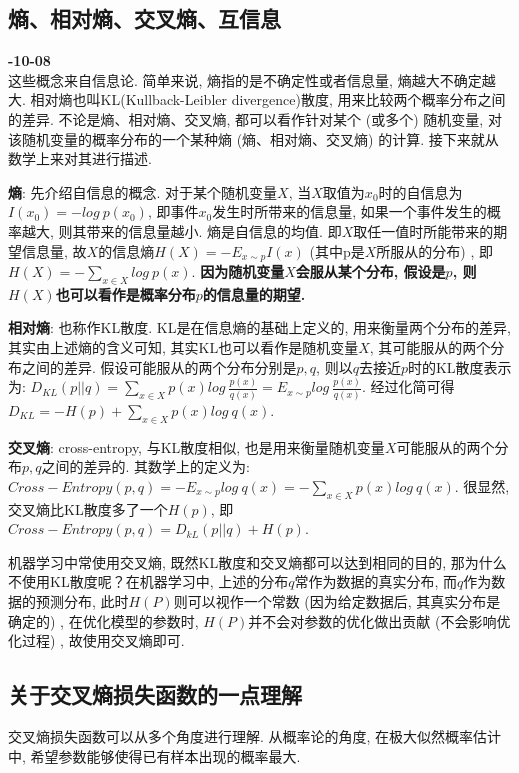\subsection{熵、相对熵、交叉熵、互信息} 
\textbf{-10-08}\\
这些概念来自信息论\cite{6773024}. 简单来说, 熵指的是不确定性或者信息量, 熵越大不确定越大. 相对熵也叫KL(Kullback-Leibler divergence)散度, 用来比较两个概率分布之间的差异. 不论是熵、相对熵、交叉熵, 都可以看作针对某个 (或多个) 随机变量, 对该随机变量的概率分布的一个某种熵 (熵、相对熵、交叉熵) 的计算. 接下来就从数学上来对其进行描述. 

\textbf{熵}: 先介绍自信息的概念. 对于某个随机变量$X$, 当$X$取值为$x_0$时的自信息为$I(x_0) = -log\ p(x_0)$, 即事件$x_0$发生时所带来的信息量, 如果一个事件发生的概率越大, 则其带来的信息量越小. 熵是自信息的均值. 即$X$取任一值时所能带来的期望信息量, 故$X$的信息熵$H(X) = -E_{x\sim p}I(x)$ (其中p是$X$所服从的分布) , 即$H(X) = -\sum_{x \in X}log\ p(x)$. \textbf{因为随机变量$X$会服从某个分布, 假设是$p$, 则$H(X)$也可以看作是概率分布$p$的信息量的期望. }

\textbf{相对熵}: 也称作KL散度. KL是在信息熵的基础上定义的, 用来衡量两个分布的差异, 其实由上述熵的含义可知, 其实KL也可以看作是随机变量$X$, 其可能服从的两个分布之间的差异. 假设可能服从的两个分布分别是$p, q$, 则以$q$去接近$p$时的KL散度表示为: $D_{KL}(p||q) = \sum_{x \in X} p(x) log\ \frac{p(x)}{q(x)} = E_{x\sim p} log\ \frac{p(x)}{q(x)}$. 经过化简可得$D_{KL} = -H(p) + \sum_{x \in X}p(x)log\ q(x)$. 

\textbf{交叉熵}: \label{ce}cross-entropy, 与KL散度相似, 也是用来衡量随机变量$X$可能服从的两个分布$p, q$之间的差异的. 其数学上的定义为: $Cross-Entropy(p, q) = -E_{x\sim p} log\ q(x) = - \sum_{x \in X}p(x)log\ q(x)$. 很显然, 交叉熵比KL散度多了一个$H(p)$, 即$Cross-Entropy(p, q) = D_{kL}(p || q) + H(p)$. 

机器学习中常使用交叉熵, 既然KL散度和交叉熵都可以达到相同的目的, 那为什么不使用KL散度呢？在机器学习中, 上述的分布$q$常作为数据的真实分布, 而$q$作为数据的预测分布, 此时$H(P)$则可以视作一个常数 (因为给定数据后, 其真实分布是确定的) , 在优化模型的参数时, $H(P)$并不会对参数的优化做出贡献 (不会影响优化过程) , 故使用交叉熵即可. 

\subsection{关于交叉熵损失函数的一点理解}
交叉熵损失函数可以从多个角度进行理解. 从概率论的角度, 在极大似然概率估计中, 希望参数能够使得已有样本出现的概率最大. 

